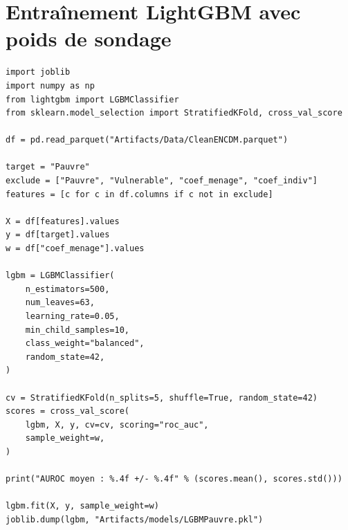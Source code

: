 \documentclass[12pt,a4paper]{report}
\begin{document}
\section{Entraînement LightGBM avec poids de sondage}

\begin{lstlisting}[caption={Entrainement du classifieur LightGBM avec poids de sondage ENCDM}]
import joblib
import numpy as np
from lightgbm import LGBMClassifier
from sklearn.model_selection import StratifiedKFold, cross_val_score

df = pd.read_parquet("Artifacts/Data/CleanENCDM.parquet")

target = "Pauvre"
exclude = ["Pauvre", "Vulnerable", "coef_menage", "coef_indiv"]
features = [c for c in df.columns if c not in exclude]

X = df[features].values
y = df[target].values
w = df["coef_menage"].values

lgbm = LGBMClassifier(
    n_estimators=500,
    num_leaves=63,
    learning_rate=0.05,
    min_child_samples=10,
    class_weight="balanced",
    random_state=42,
)

cv = StratifiedKFold(n_splits=5, shuffle=True, random_state=42)
scores = cross_val_score(
    lgbm, X, y, cv=cv, scoring="roc_auc",
    sample_weight=w,
)

print("AUROC moyen : %.4f +/- %.4f" % (scores.mean(), scores.std()))

lgbm.fit(X, y, sample_weight=w)
joblib.dump(lgbm, "Artifacts/models/LGBMPauvre.pkl")
\end{lstlisting}
\end{document}
